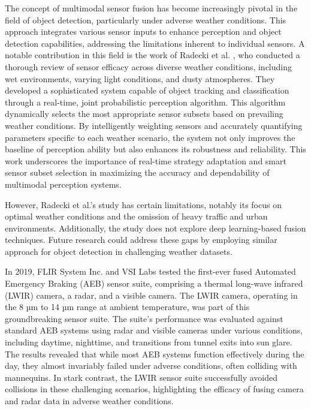 \documentclass[report.tex]{subfiles}
\begin{document}



    The concept of multimodal sensor fusion has become increasingly pivotal in the field of object detection, particularly under adverse weather conditions. This approach integrates various sensor inputs to enhance perception and object detection capabilities, addressing the limitations inherent to individual sensors. A notable contribution in this field is the work of Radecki et al. \cite{radecki2016all}, who conducted a thorough review of sensor efficacy across diverse weather conditions, including wet environments, varying light conditions, and dusty atmospheres. They developed a sophisticated system capable of object tracking and classification through a real-time, joint probabilistic perception algorithm. This algorithm dynamically selects the most appropriate sensor subsets based on prevailing weather conditions. By intelligently weighting sensors and accurately quantifying parameters specific to each weather scenario, the system not only improves the baseline of perception ability but also enhances its robustness and reliability. This work underscores the importance of real-time strategy adaptation and smart sensor subset selection in maximizing the accuracy and dependability of multimodal perception systems.

    However, Radecki et al.'s study \cite{radecki2016all} has certain limitations, notably its focus on optimal weather conditions and the omission of heavy traffic and urban environments. Additionally, the study does not explore deep learning-based fusion techniques. Future research could address these gaps by employing similar approach for object detection in challenging weather datasets.

    In 2019, FLIR System Inc. \cite{fused_aeb} and VSI Labs \cite{VSILabs} tested the first-ever fused Automated Emergency Braking (AEB) sensor suite, comprising a thermal long-wave infrared (LWIR) camera, a radar, and a visible camera. The LWIR camera, operating in the 8 µm to 14 µm range at ambient temperature, was part of this groundbreaking sensor suite. The suite's performance was evaluated against standard AEB systems using radar and visible cameras under various conditions, including daytime, nighttime, and transitions from tunnel exits into sun glare. The results revealed that while most AEB systems function effectively during the day, they almost invariably failed under adverse conditions, often colliding with mannequins. In stark contrast, the LWIR sensor suite successfully avoided collisions in these challenging scenarios, highlighting the efficacy of fusing camera and radar data in adverse weather conditions.
\end{document}
